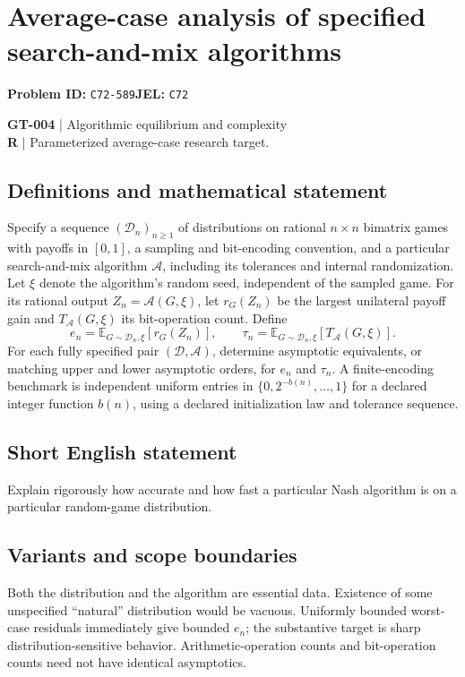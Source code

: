 \documentclass[11pt,a4paper]{article}
\begin{document}
\section*{Average-case analysis of specified search-and-mix algorithms}
\textbf{Problem ID:} \texttt{C72-589}\quad \textbf{JEL:} \texttt{C72}\par
\label{problem:OP-0134}
\label{game:GT-004}
{\sffamily\small\color{muted}
\textbf{GT-004} | Algorithmic equilibrium and complexity\\
\textbf{R} | Parameterized average-case research target.
\par}
\subsection*{Definitions and mathematical statement}
Specify a sequence $(\mathcal D_n)_{n\geq1}$ of distributions on rational $n\times n$ bimatrix games with payoffs in $[0,1]$, a sampling and bit-encoding convention, and a particular search-and-mix algorithm $\mathcal A$, including its tolerances and internal randomization. Let $\xi$ denote the algorithm's random seed, independent of the sampled game. For its rational output $Z_n=\mathcal A(G,\xi)$, let $r_G(Z_n)$ be the largest unilateral payoff gain and $T_{\mathcal A}(G,\xi)$ its bit-operation count. Define
\[
 e_n=\mathbb E_{G\sim\mathcal D_n,\xi}[r_G(Z_n)],\qquad
 \tau_n=\mathbb E_{G\sim\mathcal D_n,\xi}[T_{\mathcal A}(G,\xi)].
\]
For each fully specified pair $(\mathcal D,\mathcal A)$, determine asymptotic equivalents, or matching upper and lower asymptotic orders, for $e_n$ and $\tau_n$. A finite-encoding benchmark is independent uniform entries in $\{0,2^{-b(n)},\ldots,1\}$ for a declared integer function $b(n)$, using a declared initialization law and tolerance sequence.
\subsection*{Short English statement}
Explain rigorously how accurate and how fast a particular Nash algorithm is on a particular random-game distribution.
\subsection*{Variants and scope boundaries}
Both the distribution and the algorithm are essential data. Existence of some unspecified ``natural'' distribution would be vacuous. Uniformly bounded worst-case residuals immediately give bounded $e_n$; the substantive target is sharp distribution-sensitive behavior. Arithmetic-operation counts and bit-operation counts need not have identical asymptotics.
\end{document}
